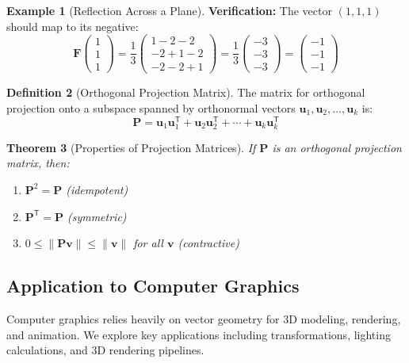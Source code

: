 \documentclass[12pt]{article}
\numberwithin{equation}{section}
\newcommand{\vect}[1]{\boldsymbol{#1}}   %
\newcommand{\mat}[1]{\mathbf{#1}}        %
\newcommand{\trans}{\mathsf{T}}          %
\theoremstyle{plain}
\newtheorem{theorem}{Theorem}[section]
\theoremstyle{definition}
\newtheorem{definition}[theorem]{Definition}
\newtheorem{example}[theorem]{Example}
\theoremstyle{remark}
\begin{document}
\begin{example}[Reflection Across a Plane]
\textbf{Verification:} The vector $(1, 1, 1)$ should map to its negative:
$$\mat{F}\begin{pmatrix} 1 \\ 1 \\ 1 \end{pmatrix} = \frac{1}{3}\begin{pmatrix} 1 - 2 - 2 \\ -2 + 1 - 2 \\ -2 - 2 + 1 \end{pmatrix} = \frac{1}{3}\begin{pmatrix} -3 \\ -3 \\ -3 \end{pmatrix} = \begin{pmatrix} -1 \\ -1 \\ -1 \end{pmatrix}$$ \checkmark
\end{example}

\begin{definition}[Orthogonal Projection Matrix]
The matrix for orthogonal projection onto a subspace spanned by orthonormal vectors $\vect{u}_1, \vect{u}_2, \ldots, \vect{u}_k$ is:
$$\mat{P} = \vect{u}_1\vect{u}_1^{\trans} + \vect{u}_2\vect{u}_2^{\trans} + \cdots + \vect{u}_k\vect{u}_k^{\trans}$$
\end{definition}

\begin{theorem}[Properties of Projection Matrices]
If $\mat{P}$ is an orthogonal projection matrix, then:
\begin{enumerate}
\item $\mat{P}^2 = \mat{P}$ (idempotent)
\item $\mat{P}^{\trans} = \mat{P}$ (symmetric)
\item $0 \leq \|\mat{P}\vect{v}\| \leq \|\vect{v}\|$ for all $\vect{v}$ (contractive)
\end{enumerate}
\end{theorem}

\subsection{Application to Computer Graphics}

Computer graphics relies heavily on vector geometry for 3D modeling, rendering, and animation. We explore key applications including transformations, lighting calculations, and 3D rendering pipelines.
\end{document}
